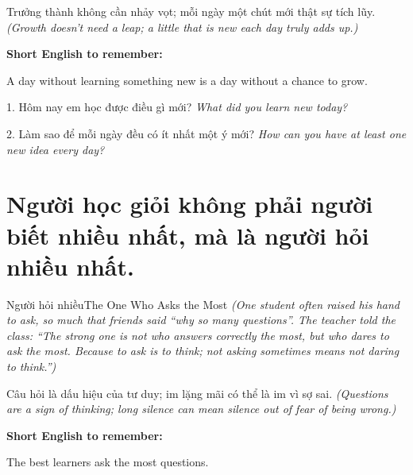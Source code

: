 \begin{baihoc}
Trưởng thành không cần nhảy vọt; mỗi ngày một chút mới thật sự tích lũy.
\textit{(Growth doesn't need a leap; a little that is new each day truly adds up.)}
\end{baihoc}

\begin{ghinhoanh}
\textbf{Short English to remember:}

A day without learning something new is a day without a chance to grow.

\end{ghinhoanh}

\begin{tuhocnhanh}
1. Hôm nay em học được điều gì mới? \textit{What did you learn new today?}

2. Làm sao để mỗi ngày đều có ít nhất một ý mới? \textit{How can you have at least one new idea every day?}
\end{tuhocnhanh}
\ngancach

\section{Người học giỏi không phải người biết nhiều nhất, mà là người hỏi nhiều nhất.}
\begin{truyen}{Người hỏi nhiều}{The One Who Asks the Most}
\textit{(One student often raised his hand to ask, so much that friends said ``why so many questions''. The teacher told the class: ``The strong one is not who answers correctly the most, but who dares to ask the most. Because to ask is to think; not asking sometimes means not daring to think.'')}
\end{truyen}

\begin{baihoc}
Câu hỏi là dấu hiệu của tư duy; im lặng mãi có thể là im vì sợ sai.
\textit{(Questions are a sign of thinking; long silence can mean silence out of fear of being wrong.)}
\end{baihoc}

\begin{ghinhoanh}
\textbf{Short English to remember:}

The best learners ask the most questions.

\end{ghinhoanh}

